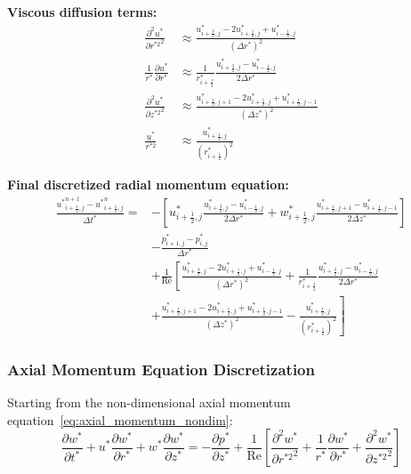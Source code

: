\documentclass[12pt,a4paper]{article}
\newcommand{\parder}[2]{\frac{\partial #1}{\partial #2}}
\newcommand{\pparder}[2]{\frac{\partial^2 #1}{\partial {#2}^2}}
\newcommand{\Rey}{\text{Re}}
\begin{document}
\textbf{Viscous diffusion terms:}
\begin{align}
    \pparder{u^*}{r^{*2}} &\approx \frac{u^*_{i+\frac{3}{2},j} - 2u^*_{i+\frac{1}{2},j} + u^*_{i-\frac{1}{2},j}}{(\Delta r^*)^2} \\
    \frac{1}{r^*}\parder{u^*}{r^*} &\approx \frac{1}{r^*_{i+\frac{1}{2}}}\frac{u^*_{i+\frac{3}{2},j} - u^*_{i-\frac{1}{2},j}}{2\Delta r^*} \\
    \pparder{u^*}{z^{*2}} &\approx \frac{u^*_{i+\frac{1}{2},j+1} - 2u^*_{i+\frac{1}{2},j} + u^*_{i+\frac{1}{2},j-1}}{(\Delta z^*)^2} \\
    \frac{u^*}{r^{*2}} &\approx \frac{u^*_{i+\frac{1}{2},j}}{(r^*_{i+\frac{1}{2}})^2}
\end{align}

\textbf{Final discretized radial momentum equation:}
\begin{equation}
\boxed{
\begin{aligned}
    \frac{{u^*}_{i+\frac{1}{2},j}^{n+1} - {u^*}_{i+\frac{1}{2},j}^{n}}{\Delta t^*} = &-\left[u^*_{i+\frac{1}{2},j}\frac{u^*_{i+\frac{3}{2},j} - u^*_{i-\frac{1}{2},j}}{2\Delta r^*} + w^*_{i+\frac{1}{2},j}\frac{u^*_{i+\frac{1}{2},j+1} - u^*_{i+\frac{1}{2},j-1}}{2\Delta z^*}\right] \\
    &- \frac{p^*_{i+1,j} - p^*_{i,j}}{\Delta r^*} \\
    &+ \frac{1}{\Rey}\left[\frac{u^*_{i+\frac{3}{2},j} - 2u^*_{i+\frac{1}{2},j} + u^*_{i-\frac{1}{2},j}}{(\Delta r^*)^2} + \frac{1}{r^*_{i+\frac{1}{2}}}\frac{u^*_{i+\frac{3}{2},j} - u^*_{i-\frac{1}{2},j}}{2\Delta r^*}\right. \\
    &\left.+ \frac{u^*_{i+\frac{1}{2},j+1} - 2u^*_{i+\frac{1}{2},j} + u^*_{i+\frac{1}{2},j-1}}{(\Delta z^*)^2} - \frac{u^*_{i+\frac{1}{2},j}}{(r^*_{i+\frac{1}{2}})^2}\right]
\end{aligned}
}
\end{equation}

\subsubsection{Axial Momentum Equation Discretization}

Starting from the non-dimensional axial momentum equation~\eqref{eq:axial_momentum_nondim}:
\begin{equation}
    \parder{w^*}{t^*} + u^*\parder{w^*}{r^*} + w^*\parder{w^*}{z^*} = -\parder{p^*}{z^*} + \frac{1}{\Rey}\left[\pparder{w^*}{r^{*2}} + \frac{1}{r^*}\parder{w^*}{r^*} + \pparder{w^*}{z^{*2}}\right]
\end{equation}
\end{document}
